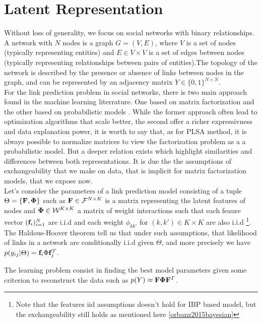 \section{Latent Representation}
\label{sec:background}
Without loss of generality, we focus on social networks with binary relationships. A network with $N$ nodes is a graph $G = (V,E)$, where $V$ is a set of nodes (typically representing entities) and $E \in V \times V$ is a set of edges between nodes (typically representing relationships between pairs of entities).The topology of the network is described by the presence or absence of links between nodes in the graph, and can be represented by an adjacency matrix $Y \in \{0,1\}^{N\times N}$.\\

For the link prediction problem in social networks, there is two main approach found in the machine learning literrature. One based on matrix factorization \cite{menon2011link} and the other based on probabilistic models \cite{goldenberg2010survey}. While the former approach often lead to optimization algorithms that scale better, the second offer a richer expressivness and data explanation power, it is worth to say that, as for PLSA method, it is always possible to normalize matrices to view the factorization problem as a a probabilistic model. But a deeper relation exists which highlight similarities and differences between both representations. It is due the the assumptions of exchangeability that we make on data, that is implicit for matrix factorization models, that we expose now.\\

Let's consider the parameters of a link prediction model consisting of a tuple $\Theta = \{ \mathbf{F} , \mathbf{\Phi}\}$ such as $\mathbf{F} \in \mathcal{F}^{N\times K}$ is a matrix representing the latent features of nodes and $\mathbf{\Phi} \in \mathcal{W}^{K\times K}$ a matrix of weight interactions such that each feaure vector $(\mathbf{f}_i)_{i=1}^N$ are i.i.d and each weight $\phi_{kk'}$ for $(k,k') \in K\times K$ are also i.i.d \footnote{Note that the features iid assumptions doesn't hold for IBP based model, but the exchangeability still holds as mentioned here \ref{orbanz2015bayesian}}. The Haldous-Hoover theorem \cite{orbanz2015bayesian} tell us that under such assumptions, that likelihood of links in a network are conditionally i.i.d given $\Theta$, and more precisely we have $p(y_{ij}|\Theta) = \mathbf{f}_i \Phi \mathbf{f}_j^T$.

The learning problem consist in finding the best model parameters given some criterion to reconstruct the data such as $p(Y) \approx \mathbf{F}\mathbf{\Phi}\mathbf{F}^T$. 

